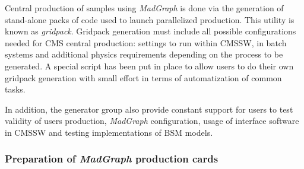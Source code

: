 Central production of samples using \textit{MadGraph} is done via the generation of stand-alone packs of code used to launch parallelized production. This utility is known as \textit{gridpack}. Gridpack generation must include all possible configurations needed for CMS central production: settings to run within CMSSW, in batch systems and additional physics requirements depending on the process to be generated. A special script has been put in place to allow users to do their own gridpack generation with small effort in terms of automatization of common tasks.

In addition, the generator group also provide constant support for users to test validity of users production, \textit{MadGraph} configuration, usage of interface software in CMSSW and testing implementations of BSM models.

\subsubsection{Preparation of \textit{MadGraph} production cards}

